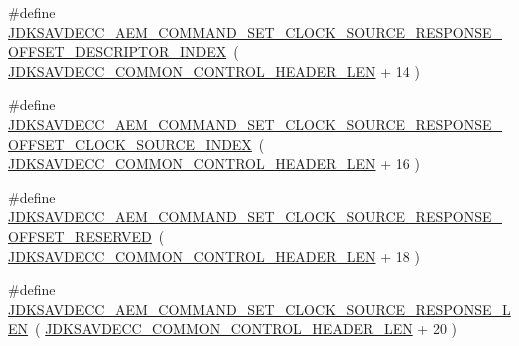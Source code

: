\begin{DoxyCompactItemize}
\item 
\#define \hyperlink{group__command__set__clock__source__response_gaff08f8039a591f164c603d8e8666e6c9}{J\+D\+K\+S\+A\+V\+D\+E\+C\+C\+\_\+\+A\+E\+M\+\_\+\+C\+O\+M\+M\+A\+N\+D\+\_\+\+S\+E\+T\+\_\+\+C\+L\+O\+C\+K\+\_\+\+S\+O\+U\+R\+C\+E\+\_\+\+R\+E\+S\+P\+O\+N\+S\+E\+\_\+\+O\+F\+F\+S\+E\+T\+\_\+\+D\+E\+S\+C\+R\+I\+P\+T\+O\+R\+\_\+\+I\+N\+D\+EX}~( \hyperlink{group__jdksavdecc__avtp__common__control__header_gaae84052886fb1bb42f3bc5f85b741dff}{J\+D\+K\+S\+A\+V\+D\+E\+C\+C\+\_\+\+C\+O\+M\+M\+O\+N\+\_\+\+C\+O\+N\+T\+R\+O\+L\+\_\+\+H\+E\+A\+D\+E\+R\+\_\+\+L\+EN} + 14 )
\item 
\#define \hyperlink{group__command__set__clock__source__response_ga253449bbd6222ad4b52fec3c7cf3aaa2}{J\+D\+K\+S\+A\+V\+D\+E\+C\+C\+\_\+\+A\+E\+M\+\_\+\+C\+O\+M\+M\+A\+N\+D\+\_\+\+S\+E\+T\+\_\+\+C\+L\+O\+C\+K\+\_\+\+S\+O\+U\+R\+C\+E\+\_\+\+R\+E\+S\+P\+O\+N\+S\+E\+\_\+\+O\+F\+F\+S\+E\+T\+\_\+\+C\+L\+O\+C\+K\+\_\+\+S\+O\+U\+R\+C\+E\+\_\+\+I\+N\+D\+EX}~( \hyperlink{group__jdksavdecc__avtp__common__control__header_gaae84052886fb1bb42f3bc5f85b741dff}{J\+D\+K\+S\+A\+V\+D\+E\+C\+C\+\_\+\+C\+O\+M\+M\+O\+N\+\_\+\+C\+O\+N\+T\+R\+O\+L\+\_\+\+H\+E\+A\+D\+E\+R\+\_\+\+L\+EN} + 16 )
\item 
\#define \hyperlink{group__command__set__clock__source__response_gafb52ada800a5e386bc9e2c442bca71d8}{J\+D\+K\+S\+A\+V\+D\+E\+C\+C\+\_\+\+A\+E\+M\+\_\+\+C\+O\+M\+M\+A\+N\+D\+\_\+\+S\+E\+T\+\_\+\+C\+L\+O\+C\+K\+\_\+\+S\+O\+U\+R\+C\+E\+\_\+\+R\+E\+S\+P\+O\+N\+S\+E\+\_\+\+O\+F\+F\+S\+E\+T\+\_\+\+R\+E\+S\+E\+R\+V\+ED}~( \hyperlink{group__jdksavdecc__avtp__common__control__header_gaae84052886fb1bb42f3bc5f85b741dff}{J\+D\+K\+S\+A\+V\+D\+E\+C\+C\+\_\+\+C\+O\+M\+M\+O\+N\+\_\+\+C\+O\+N\+T\+R\+O\+L\+\_\+\+H\+E\+A\+D\+E\+R\+\_\+\+L\+EN} + 18 )
\item 
\#define \hyperlink{group__command__set__clock__source__response_ga2f7212bbaae35f932ace0d4f8425b767}{J\+D\+K\+S\+A\+V\+D\+E\+C\+C\+\_\+\+A\+E\+M\+\_\+\+C\+O\+M\+M\+A\+N\+D\+\_\+\+S\+E\+T\+\_\+\+C\+L\+O\+C\+K\+\_\+\+S\+O\+U\+R\+C\+E\+\_\+\+R\+E\+S\+P\+O\+N\+S\+E\+\_\+\+L\+EN}~( \hyperlink{group__jdksavdecc__avtp__common__control__header_gaae84052886fb1bb42f3bc5f85b741dff}{J\+D\+K\+S\+A\+V\+D\+E\+C\+C\+\_\+\+C\+O\+M\+M\+O\+N\+\_\+\+C\+O\+N\+T\+R\+O\+L\+\_\+\+H\+E\+A\+D\+E\+R\+\_\+\+L\+EN} + 20 )
\end{DoxyCompactItemize}
